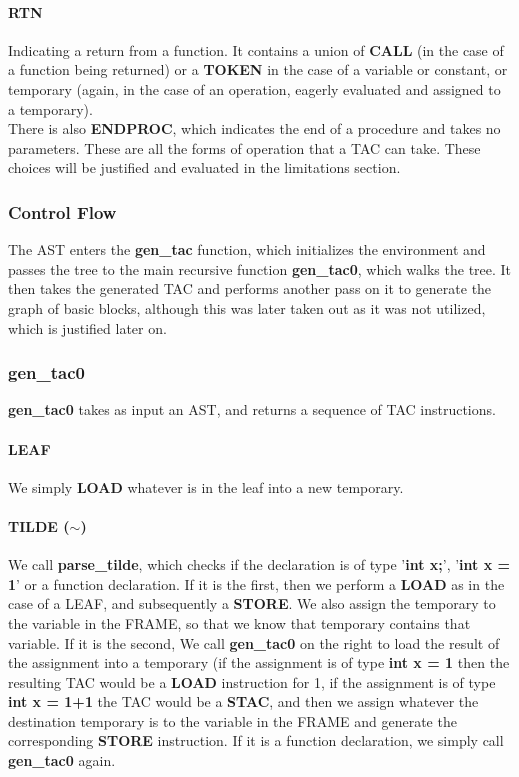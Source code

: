 \documentclass[12pt]{article}
\begin{document}
\paragraph{RTN} Indicating a return from a function. It contains a union of \textbf{CALL} (in the case of a function being returned) or a \textbf{TOKEN} in the case of a variable or constant, or temporary (again, in the case of an operation, eagerly evaluated and assigned to a temporary).
\\\newline There is also \textbf{ENDPROC}, which indicates the end of a procedure and takes no parameters. These are all the forms of operation that a TAC can take. These choices will be justified and evaluated in the limitations section. 
\subsubsection{Control Flow}
  The AST enters the \textbf{gen\_tac} function, which initializes the environment and passes the tree to the main recursive function \textbf{gen\_tac0}, which walks the tree. It then takes the generated TAC and performs another pass on it to generate the graph of basic blocks, although this was later taken out as it was not utilized, which is justified later on. 
\subsubsection{gen\_tac0}
\textbf{gen\_tac0} takes as input an AST, and returns a sequence of TAC instructions. 
\paragraph{LEAF} We simply \textbf{LOAD} whatever is in the leaf into a new temporary.
\paragraph{TILDE ($\sim$)} We call \textbf{parse\_tilde}, which checks if the declaration is of type '\textbf{int x;}', '\textbf{int x = 1}' or a function declaration. If it is the first, then we perform a \textbf{LOAD} as in the case of a LEAF, and subsequently a \textbf{STORE}. We also assign the temporary to the variable in the FRAME, so that we know that temporary contains that variable. If it is the second, 
We call \textbf{gen\_tac0} on the right to load the result of the assignment into a temporary (if the assignment is of type \textbf{int x = 1} then the resulting TAC would be a \textbf{LOAD} instruction for 1, if the assignment is of type \textbf{int x = 1+1} the TAC would be a \textbf{STAC}, and then we assign whatever the destination temporary is to the variable in the FRAME and generate the corresponding \textbf{STORE} instruction. If it is a function declaration, we simply call \textbf{gen\_tac0} again.
\end{document}
